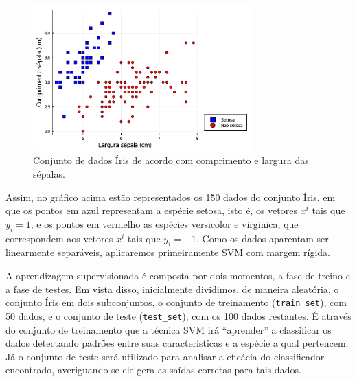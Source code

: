 \documentclass[12pt,a4paper]{scrartcl}
\theoremstyle{definition}%
\newcommand{\prompt}[4]{
        \ttfamily\llap{{\color{#2}[#3]:\hspace{3pt}#4}}\vspace{-\baselineskip}
    }
\begin{document}
{ %
        \begin{figure}
            \centering
            \includegraphics[width=0.75\textwidth]{Implementacao_de_SVM_em_Julia_TCC_files/Implementacao_de_SVM_em_Julia_TCC_12_0.pdf}
            \caption{Conjunto de dados Íris de acordo com comprimento e largura das sépalas.}
            \label{fig:grafico_Iris_duas_caracteristicas}
        \end{figure}
    }    

Assim, no gráfico acima estão representados os 150 dados do conjunto
Íris, em que os pontos em azul representam a espécie setosa, isto é, os
vetores \(x^{i}\) tais que \(y_{i} = 1\), e os pontos em vermelho as
espécies versicolor e virginica, que correspondem aos vetores \(x^{i}\)
tais que \(y_{i} = -1\). Como os dados aparentam ser linearmente
separáveis, aplicaremos primeiramente SVM com margem rígida.

A aprendizagem supervisionada é composta por dois momentos, a fase de
treino e a fase de testes. Em vista disso, inicialmente dividimos, de
maneira aleatória, o conjunto Íris em dois subconjuntos, o conjunto de
treinamento (\texttt{train\_set}), com 50 dados, e o conjunto de teste
(\texttt{test\_set}), com os 100 dados restantes. É através do conjunto
de treinamento que a técnica SVM irá ``aprender'' a classificar os
dados detectando padrões entre suas características e a espécie a qual
pertencem. Já o conjunto de teste será utilizado para analisar a
eficácia do classificador encontrado, averiguando se ele gera as saídas
corretas para tais dados.
\end{document}
